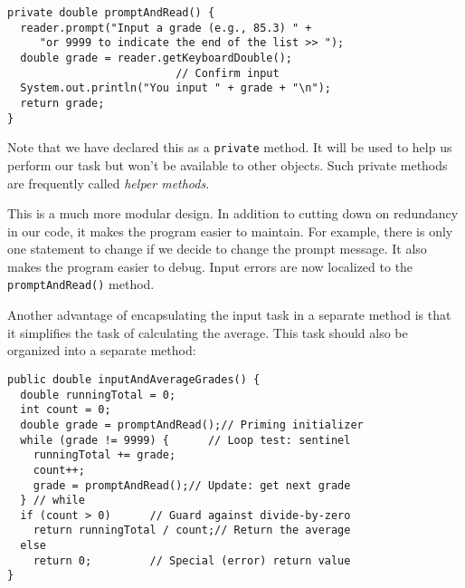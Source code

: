 \begin{jjjlisting}
\begin{lstlisting}
private double promptAndRead() {
  reader.prompt("Input a grade (e.g., 85.3) " +
     "or 9999 to indicate the end of the list >> ");
  double grade = reader.getKeyboardDouble();
                          // Confirm input
  System.out.println("You input " + grade + "\n"); 
  return grade;
}
\end{lstlisting}
\end{jjjlisting}

\noindent Note that we have declared this as a {\tt private}
method. It will be used to help us perform our task but won't be
available to other objects. Such private methods are frequently called
{\em helper methods}.

This is a much more modular design. In addition to cutting down on
redundancy in our code, it makes the program easier to maintain. For
example, there is only one statement to change if we decide to change
the prompt message.  It also makes the program easier to debug. Input
errors are now localized to the {\tt promptAndRead()} method.



\noindent Another advantage of encapsulating the input task in a
separate method is that it simplifies the task of calculating the
average. This task should also be organized into a separate method:

\begin{jjjlisting}
\begin{lstlisting}
public double inputAndAverageGrades() {
  double runningTotal = 0;
  int count = 0;
  double grade = promptAndRead();// Priming initializer
  while (grade != 9999) {      // Loop test: sentinel
    runningTotal += grade;                           
    count++;                                          
    grade = promptAndRead();// Update: get next grade
  } // while
  if (count > 0)      // Guard against divide-by-zero
    return runningTotal / count;// Return the average
  else
    return 0;         // Special (error) return value
}
\end{lstlisting}
\end{jjjlisting}

